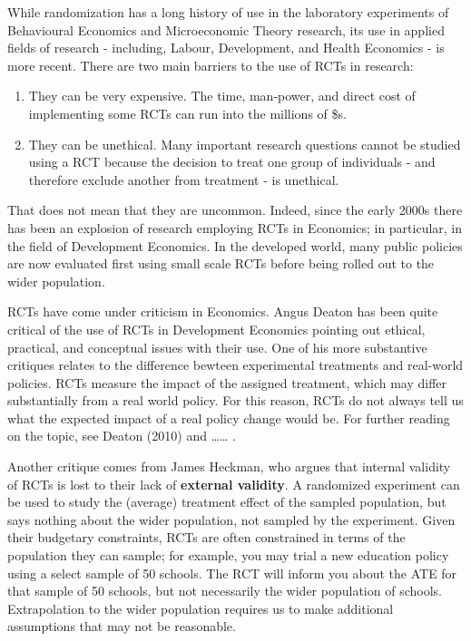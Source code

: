 \documentclass[
  letterpaper,
  DIV=11,
  numbers=noendperiod]{scrreprt}
\theoremstyle{definition}
\theoremstyle{remark}
\begin{document}
While randomization has a long history of use in the laboratory
experiments of Behavioural Economics and Microeconomic Theory research,
its use in applied fields of research - including, Labour, Development,
and Health Economics - is more recent. There are two main barriers to
the use of RCTs in research:

\begin{enumerate}
\def\labelenumi{\arabic{enumi}.}
\item
  They can be very expensive. The time, man-power, and direct cost of
  implementing some RCTs can run into the millions of \$s.
\item
  They can be unethical. Many important research questions cannot be
  studied using a RCT because the decision to treat one group of
  individuals - and therefore exclude another from treatment - is
  unethical.
\end{enumerate}

That does not mean that they are uncommon. Indeed, since the early 2000s
there has been an explosion of research employing RCTs in Economics; in
particular, in the field of Development Economics. In the developed
world, many public policies are now evaluated first using small scale
RCTs before being rolled out to the wider population.

RCTs have come under criticism in Economics. Angus Deaton has been quite
critical of the use of RCTs in Development Economics pointing out
ethical, practical, and conceptual issues with their use. One of his
more substantive critiques relates to the difference bewteen
experimental treatments and real-world policies. RCTs measure the impact
of the assigned treatment, which may differ substantially from a real
world policy. For this reason, RCTs do not always tell us what the
expected impact of a real policy change would be. For further reading on
the topic, see Deaton (2010) and \ldots\ldots{} .

Another critique comes from James Heckman, who argues that internal
validity of RCTs is lost to their lack of \textbf{external validity}. A
randomized experiment can be used to study the (average) treatment
effect of the sampled population, but says nothing about the wider
population, not sampled by the experiment. Given their budgetary
constraints, RCTs are often constrained in terms of the population they
can sample; for example, you may trial a new education policy using a
select sample of 50 schools. The RCT will inform you about the ATE for
that sample of 50 schools, but not necessarily the wider population of
schools. Extrapolation to the wider population requires us to make
additional assumptions that may not be reasonable.
\end{document}
